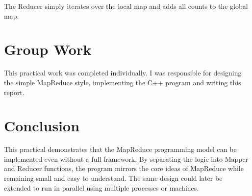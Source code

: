 \documentclass[a4paper,11pt]{article}
\begin{document}
The Reducer simply iterates over the local map and adds all counts to
the global map.

\section{Group Work}
This practical work was completed individually. I was responsible for
designing the simple MapReduce style, implementing the C++ program and
writing this report.

\section{Conclusion}
This practical demonstrates that the MapReduce programming model can be
implemented even without a full framework. By separating the logic into
Mapper and Reducer functions, the program mirrors the core ideas of
MapReduce while remaining small and easy to understand. The same design
could later be extended to run in parallel using multiple processes or
machines.
\end{document}
